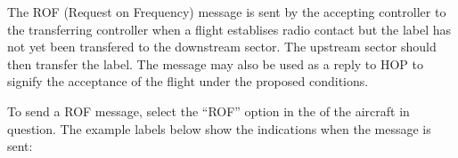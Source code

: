 \documentclass[a4paper,oneside,11pt]{memoir}
\begin{document}
The ROF (Request on Frequency) message is sent by the accepting controller to the transferring controller when a flight establises radio contact but the label has not yet been transfered to the downstream sector. The upstream sector should then transfer the label. The message may also be used as a reply to HOP to signify the acceptance of the flight under the proposed conditions.


To send a ROF message, select the “ROF” option in the  of the aircraft in question. The example labels below show the indications when the message is sent:
\end{document}
